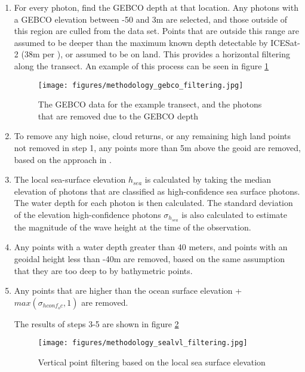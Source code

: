 \begin{enumerate}
    \item For every photon, find the GEBCO depth at that location. Any photons with a GEBCO elevation between -50 and 3m are selected, and those outside of this region are culled from the data set. Points that are outside this range are assumed to be deeper than the maximum known depth detectable by ICESat-2 (38m per \citeauthor{Parrish2019}), or assumed to be on land. This provides a horizontal filtering along the transect. An example of this process can be seen in figure \ref{fig:gebco_filtering}
    
    \begin{figure}[h!]
        \centering
        \texttt{[image: figures/methodology\_gebco\_filtering.jpg]}
        \caption{The GEBCO data for the example transect, and the photons that are removed due to the GEBCO depth}
        \label{fig:gebco_filtering}
    \end{figure}

    \item To remove any high noise, cloud returns, or any remaining high land points not removed in step 1, any points more than 5m above the geoid are removed, based on the approach in \citeauthor{Ranndal2021}.
    \item The local sea-surface elevation $h_{sea}$ is calculated by taking the median elevation of photons that are classified as high-confidence sea surface photons. The water depth for each photon is then calculated. The standard deviation of the elevation high-confidence photons $\sigma_{h_{sea}}$ is also calculated to estimate the magnitude of the wave height at the time of the observation.
    \item Any points with a water depth greater than 40 meters, and points with an geoidal height  less than -40m are removed, based on the same assumption that they are too deep to by bathymetric points. 
    \item Any points that are higher than the ocean surface elevation + $max(\sigma_{hconf_oc},1)$ are removed. 
    
    
    The results of steps 3-5  are shown in figure \ref{fig:vert_filtering}
    \begin{figure}[h!]
        \centering
        \texttt{[image: figures/methodology\_sealvl\_filtering.jpg]}
        \caption{Vertical point filtering based on the local sea surface elevation}
        \label{fig:vert_filtering}
    \end{figure}
\end{enumerate}

